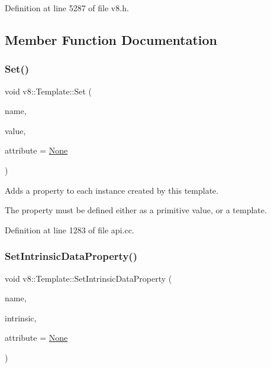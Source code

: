 Definition at line 5287 of file v8.\+h.



\subsection{Member Function Documentation}
\mbox{\label{classv8_1_1Template_a623b9f0cdd87dc861516f276cc9a7cfa}} 
\subsubsection{\texorpdfstring{Set()}{Set()}}
{\footnotesize\ttfamily void v8\+::\+Template\+::\+Set (\begin{DoxyParamCaption}\item[{\mbox{\hyperlink{classv8_1_1Local}{v8\+::\+Local}}$<$ \mbox{\hyperlink{classv8_1_1Name}{Name}} $>$}]{name,  }\item[{\mbox{\hyperlink{classv8_1_1Local}{v8\+::\+Local}}$<$ \mbox{\hyperlink{classv8_1_1Data}{Data}} $>$}]{value,  }\item[{\mbox{\hyperlink{namespacev8_a05f25f935e108a1ea2d150e274602b87}{v8\+::\+Property\+Attribute}}}]{attribute = {\ttfamily \mbox{\hyperlink{namespacev8_a05f25f935e108a1ea2d150e274602b87a7ab4d58719c33b3ea2dfaefa29b111df}{None}}} }\end{DoxyParamCaption})}

Adds a property to each instance created by this template.

The property must be defined either as a primitive value, or a template. 

Definition at line 1283 of file api.\+cc.

\mbox{\label{classv8_1_1Template_aef172ef714818a210d815de389a5ab77}} 
\subsubsection{\texorpdfstring{Set\+Intrinsic\+Data\+Property()}{SetIntrinsicDataProperty()}}
{\footnotesize\ttfamily void v8\+::\+Template\+::\+Set\+Intrinsic\+Data\+Property (\begin{DoxyParamCaption}\item[{\mbox{\hyperlink{classv8_1_1Local}{Local}}$<$ \mbox{\hyperlink{classv8_1_1Name}{Name}} $>$}]{name,  }\item[{Intrinsic}]{intrinsic,  }\item[{\mbox{\hyperlink{namespacev8_a05f25f935e108a1ea2d150e274602b87}{Property\+Attribute}}}]{attribute = {\ttfamily \mbox{\hyperlink{namespacev8_a05f25f935e108a1ea2d150e274602b87a7ab4d58719c33b3ea2dfaefa29b111df}{None}}} }\end{DoxyParamCaption})}

